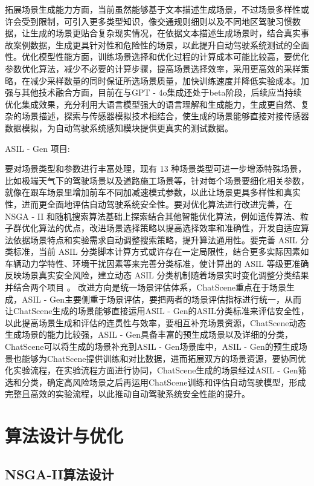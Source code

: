 拓展场景生成能力方面，当前虽然能够基于文本描述生成场景，不过场景多样性或许会受到限制，可引入更多类型知识，像交通规则细则以及不同地区驾驶习惯数据，让生成的场景更贴合复杂现实情况，在依据文本描述生成场景时，结合真实事故案例数据，生成更具针对性和危险性的场景，以此提升自动驾驶系统测试的全面性。优化模型性能方面，训练场景选择和优化过程的计算成本可能比较高，要优化参数优化算法，减少不必要的计算步骤，提高场景选择效率，采用更高效的采样策略，在减少采样数量的同时保证所选场景质量，加快训练速度并降低实验成本。加强与其他技术融合方面，目前在与GPT - 4o集成还处于beta阶段\cite{thiemann2008estimating}，后续应当持续优化集成效果，充分利用大语言模型强大的语言理解和生成能力，生成更自然、复杂的场景描述，探索与传感器模拟技术相结合，使生成的场景能够直接对接传感器数据模拟，为自动驾驶系统感知模块提供更真实的测试数据。


ASIL - Gen 项目:


要对场景类型和参数进行丰富处理，现有 13 种场景类型可进一步增添特殊场景，比如极端天气下的驾驶场景以及道路施工场景等，针对每个场景要细化相关参数，就像在跟车场景里增加前车不同加减速模式参数，以此让场景更具多样性和真实性，进而更全面地评估自动驾驶系统安全性。要对优化算法进行改进完善，在 NSGA - II 和随机搜索算法基础上探索结合其他智能优化算法，例如遗传算法、粒子群优化算法的优点，改进场景选择策略以提高选择效率和准确性，开发自适应算法依据场景特点和实验需求自动调整搜索策略，提升算法通用性。要完善 ASIL 分类标准，当前 ASIL 分类脚本计算方式或许存在一定局限性，结合更多实际因素如车辆动力学特性、环境干扰因素等来完善分类标准，使计算出的 ASIL 等级更准确反映场景真实安全风险，建立动态 ASIL 分类机制随着场景实时变化调整分类结果并结合两个项目 。
改进方向是统一场景评估体系，ChatScene重点在于场景生成，ASIL - Gen主要侧重于场景评估，要把两者的场景评估指标进行统一，从而让ChatScene生成的场景能够直接运用ASIL - Gen的ASIL分类标准来评估安全性，以此提高场景生成和评估的连贯性与效率，要相互补充场景资源，ChatScene动态生成场景的能力比较强，ASIL - Gen具备丰富的预生成场景以及详细的分类\cite{薛薇2009SPSS}，ChatScene可以将生成的场景补充到ASIL - Gen场景库中，ASIL - Gen的预生成场景也能够为ChatScene提供训练和对比数据，进而拓展双方的场景资源，要协同优化实验流程，在实验流程方面进行协同，ChatScene生成的场景经过ASIL - Gen筛选和分类，确定高风险场景之后再运用ChatScene训练和评估自动驾驶模型，形成完整且高效的实验流程，以此推动自动驾驶系统安全性能的提升。


\section{算法设计与优化}
\subsection{NSGA-II算法设计}


